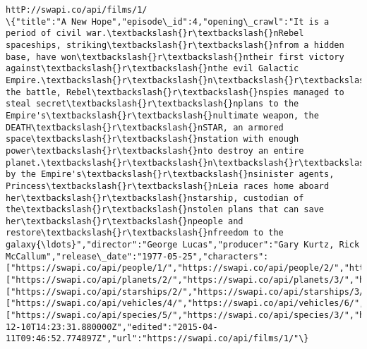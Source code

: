 \documentclass[11pt]{article}
\begin{document}
    \begin{Verbatim}[commandchars=\\\{\}]
httP://swapi.co/api/films/1/
\{"title":"A New Hope","episode\_id":4,"opening\_crawl":"It is a period of civil war.\textbackslash{}r\textbackslash{}nRebel spaceships, striking\textbackslash{}r\textbackslash{}nfrom a hidden base, have won\textbackslash{}r\textbackslash{}ntheir first victory against\textbackslash{}r\textbackslash{}nthe evil Galactic Empire.\textbackslash{}r\textbackslash{}n\textbackslash{}r\textbackslash{}nDuring the battle, Rebel\textbackslash{}r\textbackslash{}nspies managed to steal secret\textbackslash{}r\textbackslash{}nplans to the Empire's\textbackslash{}r\textbackslash{}nultimate weapon, the DEATH\textbackslash{}r\textbackslash{}nSTAR, an armored space\textbackslash{}r\textbackslash{}nstation with enough power\textbackslash{}r\textbackslash{}nto destroy an entire planet.\textbackslash{}r\textbackslash{}n\textbackslash{}r\textbackslash{}nPursued by the Empire's\textbackslash{}r\textbackslash{}nsinister agents, Princess\textbackslash{}r\textbackslash{}nLeia races home aboard her\textbackslash{}r\textbackslash{}nstarship, custodian of the\textbackslash{}r\textbackslash{}nstolen plans that can save her\textbackslash{}r\textbackslash{}npeople and restore\textbackslash{}r\textbackslash{}nfreedom to the galaxy{\ldots}","director":"George Lucas","producer":"Gary Kurtz, Rick McCallum","release\_date":"1977-05-25","characters":["https://swapi.co/api/people/1/","https://swapi.co/api/people/2/","https://swapi.co/api/people/3/","https://swapi.co/api/people/4/","https://swapi.co/api/people/5/","https://swapi.co/api/people/6/","https://swapi.co/api/people/7/","https://swapi.co/api/people/8/","https://swapi.co/api/people/9/","https://swapi.co/api/people/10/","https://swapi.co/api/people/12/","https://swapi.co/api/people/13/","https://swapi.co/api/people/14/","https://swapi.co/api/people/15/","https://swapi.co/api/people/16/","https://swapi.co/api/people/18/","https://swapi.co/api/people/19/","https://swapi.co/api/people/81/"],"planets":["https://swapi.co/api/planets/2/","https://swapi.co/api/planets/3/","https://swapi.co/api/planets/1/"],"starships":["https://swapi.co/api/starships/2/","https://swapi.co/api/starships/3/","https://swapi.co/api/starships/5/","https://swapi.co/api/starships/9/","https://swapi.co/api/starships/10/","https://swapi.co/api/starships/11/","https://swapi.co/api/starships/12/","https://swapi.co/api/starships/13/"],"vehicles":["https://swapi.co/api/vehicles/4/","https://swapi.co/api/vehicles/6/","https://swapi.co/api/vehicles/7/","https://swapi.co/api/vehicles/8/"],"species":["https://swapi.co/api/species/5/","https://swapi.co/api/species/3/","https://swapi.co/api/species/2/","https://swapi.co/api/species/1/","https://swapi.co/api/species/4/"],"created":"2014-12-10T14:23:31.880000Z","edited":"2015-04-11T09:46:52.774897Z","url":"https://swapi.co/api/films/1/"\}

\end{Verbatim}
\end{document}
